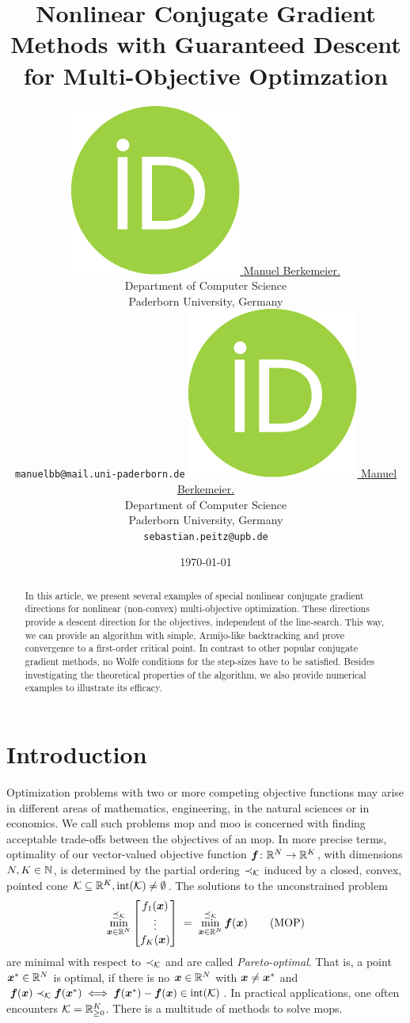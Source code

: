 \documentclass{article}
\title{
	Nonlinear Conjugate Gradient Methods with
	Guaranteed Descent for Multi-Objective Optimzation
}
\date{\today}	%
\author{%
	\href{https://orcid.org/0000-0002-3958-2277}{%
		\includegraphics[scale=0.06]{orcid.pdf}%
		\hspace{1mm}Manuel Berkemeier.%
	}\\
	Department of Computer Science\\
	Paderborn University, Germany\\
	\texttt{manuelbb@mail.uni-paderborn.de}
	\And
	\href{https://orcid.org/0000-0002-3389-793X}{%
		\includegraphics[scale=0.06]{orcid.pdf}%
		\hspace{1mm}Manuel Berkemeier.%
	}\\
	Department of Computer Science\\
	Paderborn University, Germany\\
	\texttt{sebastian.peitz@upb.de}
}%
\theoremstyle{plain}
\theoremstyle{definition}
\begin{document}
\maketitle


\begin{abstract}
In this article, we present several examples of special nonlinear conjugate
gradient directions for nonlinear (non-convex) multi-objective optimization.
These directions provide a descent direction for the objectives, independent
of the line-search.
This way, we can provide an algorithm with simple, Armijo-like backtracking 
and prove convergence to a first-order critical point.
In contrast to other popular conjugate gradient methods, no Wolfe 
conditions for the step-sizes have to be satisfied.
Besides investigating the theoretical properties of the algorithm, 
we also provide numerical examples to illustrate its efficacy.
\end{abstract}

\listoftodos

\section{Introduction}
Optimization problems with two or more competing objective functions may
arise in different areas of mathematics, engineering, in the natural sciences
or in economics.
We call such problems \ac{mop} and 
\ac{moo} is concerned with finding acceptable trade-offs between the objectives of 
an \ac{mop}.
In more precise terms, optimality of our vector-valued objective function 
$\bm{f} \colon \mathbb R^N \to \mathbb R^K$, with dimensions $N, K \in \mathbb N$,
is determined by the partial ordering $\prec_\mathcal K$ induced by a closed, convex, pointed cone 
$\mathcal K \subseteq \mathbb R^K, \operatorname{int}(\mathcal K) \neq \emptyset$.
The solutions to the unconstrained problem
\begin{equation}
	\operatorname*{min}^{\preceq_\mathcal K}_{\bm{x} \in \mathbb R^N}
	\begin{bmatrix}
		f_1(\bm{x})
		\\
		\vdots
		\\
		f_K(\bm{x})
	\end{bmatrix}
	\;
	=
	\;
	\operatorname*{min}^{\preceq_\mathcal K}_{\bm{x} \in \mathbb R^N} \bm{f}(\bm{x})
	\tag{MOP}
	\label{eqn:mop}
\end{equation}
are minimal with respect to $\prec_\mathcal K$ and are called \emph{Pareto-optimal}.
That is, a point $\bm{x}^*\in\mathbb R^N$ is optimal, if there is no $\bm{x} \in \mathbb R^N$ with 
$\bm{x} \neq \bm{x}^*$ and 
$\bm{f}(\bm{x}) \prec_\mathcal K \bm{f}(\bm{x}^*) \iff \bm{f}(\bm{x}^*) - \bm{f}(\bm{x}) \in \operatorname{int}(\mathcal K)$.
In practical applications, one often encounters $\mathcal K = \mathbb R^K_{\ge 0}$.
There is a multitude of methods to solve \acp{mop}.
\end{document}
